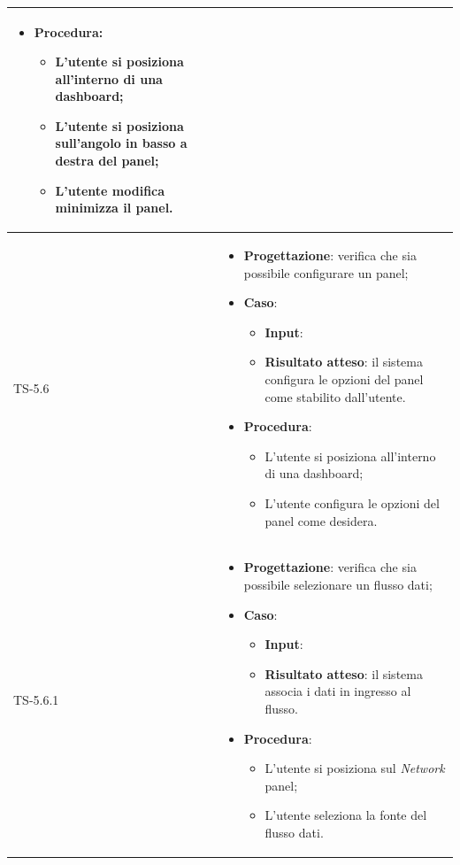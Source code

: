 \begin{longtable}{|C{2.5cm}|C{13cm}|}
\begin{itemize}
\begin{itemize}
	\end{itemize}
	\item \textbf{Procedura}:
	\begin{itemize}
		\item L'utente si posiziona all'interno di una dashboard;
		\item L'utente si posiziona sull'angolo in basso a destra del panel;
		\item L'utente modifica minimizza il panel.
	\end{itemize} 
\end{itemize}
	 \\
	\hline
	{TS-5.6} & 
\begin{itemize}
	\item \textbf{Progettazione}: verifica che sia possibile configurare un
	panel;
	\item \textbf{Caso}: 
	\begin{itemize}
		\item \textbf{Input}: 
		\item \textbf{Risultato atteso}: il sistema configura le opzioni del panel come stabilito dall'utente.
	\end{itemize}
	\item \textbf{Procedura}:
	\begin{itemize}
		\item L'utente si posiziona all'interno di una dashboard;
		\item L'utente configura le opzioni del panel come desidera.
	\end{itemize} 
\end{itemize}
	\\
	\hline
	{TS-5.6.1} & 
\begin{itemize}
	\item \textbf{Progettazione}: verifica che sia possibile selezionare un
	flusso dati;
	\item \textbf{Caso}: 
	\begin{itemize}
		\item \textbf{Input}: 
		\item \textbf{Risultato atteso}: il sistema associa i dati in ingresso al flusso.
	\end{itemize}
	\item \textbf{Procedura}:
	\begin{itemize}
		\item L'utente si posiziona sul \emph{Network} panel;
		\item L'utente seleziona la fonte del flusso dati.
	\end{itemize} 

\end{itemize}
\end{longtable}
